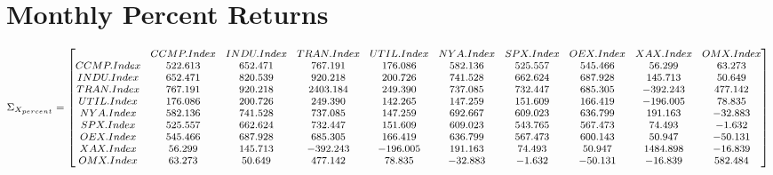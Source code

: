 \documentclass{article}
\begin{document}
\section*{Monthly Percent Returns}
\begin{equation*}
\begin{medsize}
\Sigma_{X_{percent}}=%
\begin{bmatrix}{}
  & CCMP.Index & INDU.Index & TRAN.Index & UTIL.Index & NYA.Index & SPX.Index & OEX.Index & XAX.Index & OMX.Index \\ 
 CCMP.Index & 522.613 & 652.471 & 767.191 & 176.086 & 582.136 & 525.557 & 545.466 & 56.299 & 63.273 \\ 
  INDU.Index & 652.471 & 820.539 & 920.218 & 200.726 & 741.528 & 662.624 & 687.928 & 145.713 & 50.649 \\ 
  TRAN.Index & 767.191 & 920.218 & 2403.184 & 249.390 & 737.085 & 732.447 & 685.305 & -392.243 & 477.142 \\ 
  UTIL.Index & 176.086 & 200.726 & 249.390 & 142.265 & 147.259 & 151.609 & 166.419 & -196.005 & 78.835 \\ 
  NYA.Index & 582.136 & 741.528 & 737.085 & 147.259 & 692.667 & 609.023 & 636.799 & 191.163 & -32.883 \\ 
  SPX.Index & 525.557 & 662.624 & 732.447 & 151.609 & 609.023 & 543.765 & 567.473 & 74.493 & -1.632 \\ 
  OEX.Index & 545.466 & 687.928 & 685.305 & 166.419 & 636.799 & 567.473 & 600.143 & 50.947 & -50.131 \\ 
  XAX.Index & 56.299 & 145.713 & -392.243 & -196.005 & 191.163 & 74.493 & 50.947 & 1484.898 & -16.839 \\ 
  OMX.Index & 63.273 & 50.649 & 477.142 & 78.835 & -32.883 & -1.632 & -50.131 & -16.839 & 582.484 \\ 
  \end{bmatrix}
\end{medsize}
\end{equation*}
\end{document}
